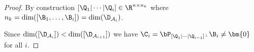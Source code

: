 \begin{proof}
        By construction $[\Q_1|\cdots|\Q_i] \in \R^{n \times n_k}$ where $n_k = \mathrm{dim}([\B_1,\dots, \B_i]) = \mathrm{dim}(\D_{\mathcal{A}_i})$.

        Since $\mathrm{dim}([\D_{\mathcal{A}_i}]) < \mathrm{dim}([\D_{\mathcal{A}_{i+1}}])$ we have $\C_i = \bP_{[\Q_1|\cdots|\Q_{i-1}]^\perp}\B_i \neq \bm{0}$ for all $i$.
        

\end{proof}


